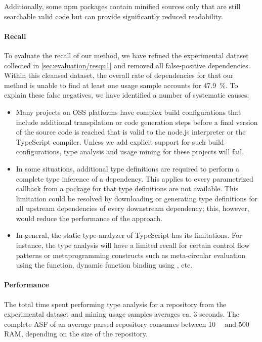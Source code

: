 Additionally, some npm packages contain minified sources only that are still searchable valid code but can provide significantly reduced readability.

\paragraph{Recall}
\label{sec:evaluation/resqu2/recall}

To evaluate the recall of our method, we have refined the experimental dataset collected in \cref{sec:evaluation/resqu1} and removed all false-positive dependencies.
Within this cleansed dataset, the overall rate of dependencies for that our method is unable to find at least one usage sample accounts for \SI{47.9}{\percent}.
To explain these false negatives, we have identified a number of systematic causes:

\begin{itemize}
	\item Many projects on OSS platforms have complex build configurations that include additional transpilation or code generation steps before a final version of the source code is reached that is valid to the node.js interpreter or the TypeScript compiler.
		Unless we add explicit support for such build configurations, type analysis and usage mining for these projects will fail.
	\item In some situations, additional type definitions are required to perform a complete type inference of a dependency.
		This applies to every parametrized callback from a package for that type definitions are not available.
		This limitation could be resolved by downloading or generating type definitions for all upstream dependencies of every downstream dependency; this, however, would reduce the performance of the approach.
	\item In general, the static type analyzer of TypeScript has its limitations.
		For instance, the type analysis will have a limited recall for certain control flow patterns or metaprogramming constructs such as meta-circular evaluation using the  function, dynamic function binding using , etc.
\end{itemize}

\paragraph{Performance}
\label{sec:evaluation/resqu2/performance}

The total time spent performing type analysis for a repository from the experimental dataset and mining usage samples averages ca. \num{3} seconds.
The complete ASF of an average parsed repository consumes between \SI{10}{\mega\byte} and \SI{500}{\mega\byte} RAM, depending on the size of the repository.

